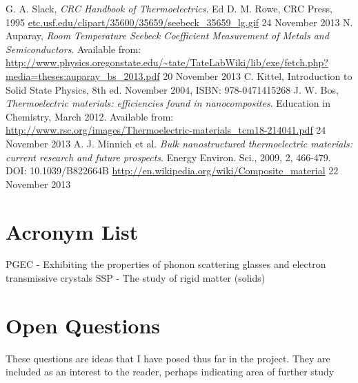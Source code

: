 \documentclass[a4paper,10pt,journal]{IEEEtran}
\begin{document}

\begin{thebibliography}{2}
G. A. Slack, \emph{CRC Handbook of Thermoelectrics}. Ed D. M. Rowe, CRC Press, 1995
\url{etc.usf.edu/clipart/35600/35659/seebeck_35659_lg.gif} 24 November
2013
N. Auparay, \emph{Room Temperature Seebeck Coefficient Measurement
of Metals and Semiconductors}. Available
from:
\url{http://www.physics.oregonstate.edu/~tate/TateLabWiki/lib/exe/fetch.php?media=theses:auparay_bs_2013.pdf} 20 November 2013
C. Kittel, Introduction to Solid State Physics, 8th ed. November 2004, ISBN: 978-0471415268
J. W. Bos, \emph{Thermoelectric materials: efficiencies found in
nanocomposites}. Education in Chemistry, March 2012. Available
from:
\url{http://www.rsc.org/images/Thermoelectric-materials_tcm18-214041.pdf} 24 November 2013
A. J. Minnich et al. \emph{Bulk nanostructured thermoelectric
materials: current research and future prospects}. Energy Environ.
Sci., 2009, 2, 466-479. DOI: 10.1039/B822664B
\url{http://en.wikipedia.org/wiki/Composite_material} 22 November 2013
\end{thebibliography}

\newpage
\appendix
\section{Acronym List}
\acresetall
\ac{PGEC} - Exhibiting the properties of phonon scattering glasses and
electron transmissive crystals
\ac{SSP} - The study of rigid matter (solids)

\section{Open Questions}
These questions are ideas that I have posed thus far in the project.
They are included as an interest to the reader, perhaps indicating
area of further study
\end{document}
